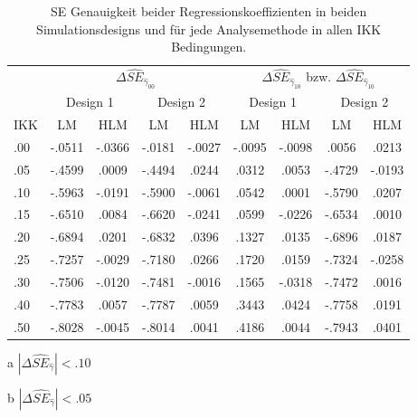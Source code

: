 \documentclass[12pt]{article}\usepackage[]{graphicx}\usepackage[]{color}
\begin{document}
\begin{table}[t!]
\centering
\setlength{\tabcolsep}{10pt}
\begin{threeparttable}
\caption{SE Genauigkeit beider Regressionskoeffizienten in beiden Simulationsdesigns und für jede Analysemethode in allen IKK Bedingungen.}
\begin{tabular}{lcccccccc}
\toprule 
& \multicolumn{4}{c}{$\Delta\widehat{SE}_{\widehat{\gamma}_{00}}$} 
& \multicolumn{4}{c}{$\Delta\widehat{SE}_{\widehat{\gamma}_{10}}$ bzw. $\Delta\widehat{SE}_{\widehat{\gamma}_{10}}$}\\
\cmidrule(lr){2-5} \cmidrule(lr){6-9}
		& 	\multicolumn{2}{c}{Design 1} & \multicolumn{2}{c}{Design 2} 
		& \multicolumn{2}{c}{Design 1} & \multicolumn{2}{c}{Design 2}\\
			\cmidrule(lr){2-3}  \cmidrule(lr){4-5} \cmidrule(lr){6-7} \cmidrule(lr){8-9}
IKK 	& 	  LM 			&  HLM 				&  LM 				&  HLM  			&  LM 				&  HLM 				&  LM 				&  HLM\\
		 	\midrule
.00 	&   -.0511\tnote{a}	&   -.0366\tnote{b} &   -.0181\tnote{b}	& 	-.0027\tnote{b} & -.0095\tnote{b} 	& -.0098\tnote{b}	&  .0056\tnote{b} 	&  .0213\tnote{b}\\ 
.05 	&  	-.4599 			&	 .0009\tnote{b}	&	-.4494			&	 .0244\tnote{b}	&  .0312\tnote{b}	&  .0053\tnote{b}	& -.4729			& -.0193\tnote{b}\\ 
.10 	&  	-.5963			&	-.0191\tnote{b}	&	-.5900			&	-.0061\tnote{b}	&  .0542\tnote{a}	&  .0001\tnote{b}	& -.5790			&  .0207\tnote{b}\\ 
.15 	&  	-.6510			&	 .0084\tnote{b}	&	-.6620			&	-.0241\tnote{b}	&  .0599\tnote{a}	& -.0226\tnote{b}	& -.6534			&  .0010\tnote{b}\\ 
.20 	&  	-.6894			&	 .0201\tnote{b}	&	-.6832			&	 .0396\tnote{b}	&  .1327	 		&  .0135\tnote{b}	& -.6896			&  .0187\tnote{b}\\ 
.25 	&   -.7257 			&	-.0029\tnote{b}	&	-.7180			&	 .0266\tnote{b}	&  .1720	 		&  .0159\tnote{b}	& -.7324			& -.0258\tnote{b}\\ 
.30 	&   -.7506 			&	-.0120\tnote{b}	&	-.7481			&	-.0016\tnote{b}	&  .1565	 		& -.0318\tnote{b}	& -.7472			&  .0016\tnote{b}\\ 
.40 	&  	-.7783			&	 .0057\tnote{b}	&	-.7787 			&	 .0059\tnote{b}	&  .3443	 		&  .0424\tnote{b}	& -.7758			&  .0191\tnote{b}\\ 
.50 	&   -.8028 			&	-.0045\tnote{b}	&	-.8014			&	 .0041\tnote{b}	&  .4186	 		&  .0044\tnote{b}	& -.7943			&  .0401\tnote{b}\\  
\bottomrule
\end{tabular}
\label{tab:se_eff_intercept}
\begin{tablenotes}
\item [a] $|\Delta\widehat{SE}_{\widehat{\gamma}}| < .10$
\item [b] $|\Delta\widehat{SE}_{\widehat{\gamma}}| < .05$
\end{tablenotes}
\end{threeparttable}
\end{table}
\end{document}
